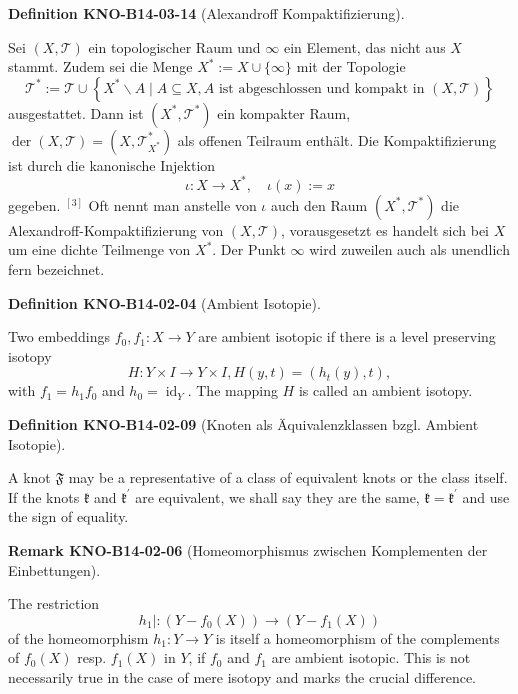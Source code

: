 \documentclass[10pt, letterpaper]{article}
\newcommand{\CustomHeading}[3]{%
  \par\medskip\noindent%
  \textbf{#1 #2} \textnormal{(#3)}.\enskip%
}
\newenvironment{DEF}[2]{\CustomHeading{Definition}{#1}{#2}}{}
\newenvironment{REM}[2]{\CustomHeading{Remark}{#1}{#2}}{}
\begin{document}
\begin{DEF}{KNO-B14-03-14}{Alexandroff Kompaktifizierung}
Sei $(X, \mathcal{T})$ ein topologischer Raum und $\infty$ ein Element, das nicht aus $X$ stammt. Zudem sei die Menge $X^*:=X \cup\{\infty\}$ mit der Topologie
$$
\mathcal{T}^*:=\mathcal{T} \cup\left\{X^* \backslash A \mid A \subseteq X, A \text { ist abgeschlossen und kompakt in }(X, \mathcal{T})\right\}
$$
ausgestattet. Dann ist $\left(X^*, \mathcal{T}^*\right)$ ein kompakter Raum, $\operatorname{der}(X, \mathcal{T})=\left(X, \mathcal{T}_{X^*}^*\right)$ als offenen Teilraum enthält. Die Kompaktifizierung ist durch die kanonische Injektion
$$
\iota: X \rightarrow X^*, \quad \iota(x):=x
$$
gegeben. ${ }^{[3]}$ Oft nennt man anstelle von $\iota$ auch den Raum $\left(X^*, \mathcal{T}^*\right)$ die Alexandroff-Kompaktifizierung von $(X, \mathcal{T})$, vorausgesetzt es handelt sich bei $X$ um eine dichte Teilmenge von $X^*$.
Der Punkt $\infty$ wird zuweilen auch als unendlich fern bezeichnet.
\end{DEF}

\begin{DEF}{KNO-B14-02-04}{Ambient Isotopie}
Two embeddings $f_{0}, f_{1}: X \rightarrow Y$ are ambient isotopic if there is a level preserving isotopy
$$
H: Y \times I \rightarrow Y \times I, H(y, t)=\left(h_{t}(y), t\right),
$$
with $f_{1}=h_{1} f_{0}$ and $h_{0}=\operatorname{id}_{Y}$. The mapping $H$ is called an ambient isotopy.
\end{DEF}

\begin{DEF}{KNO-B14-02-09}{Knoten als Äquivalenzklassen bzgl. Ambient Isotopie}
A knot $\mathfrak{F}$ may be a representative of a class of equivalent knots or the class itself. If the knots $\mathfrak{k}$ and $\mathfrak{k}^{\prime}$ are equivalent, we shall say they are the same, $\mathfrak{k}=\mathfrak{k}^{\prime}$ and use the sign of equality.
\end{DEF}

\begin{REM}{KNO-B14-02-06}{Homeomorphismus zwischen Komplementen der Einbettungen}
The restriction
$$
h_{1} \mid:\left(Y-f_{0}(X)\right) \rightarrow\left(Y-f_{1}(X)\right)
$$
of the homeomorphism $h_{1}: Y \rightarrow Y$ is itself a homeomorphism of the complements of $f_{0}(X)$ resp. $f_{1}(X)$ in $Y$, if $f_{0}$ and $f_{1}$ are ambient isotopic. This is not necessarily true in the case of mere isotopy and marks the crucial difference.
\end{REM}
\end{document}
